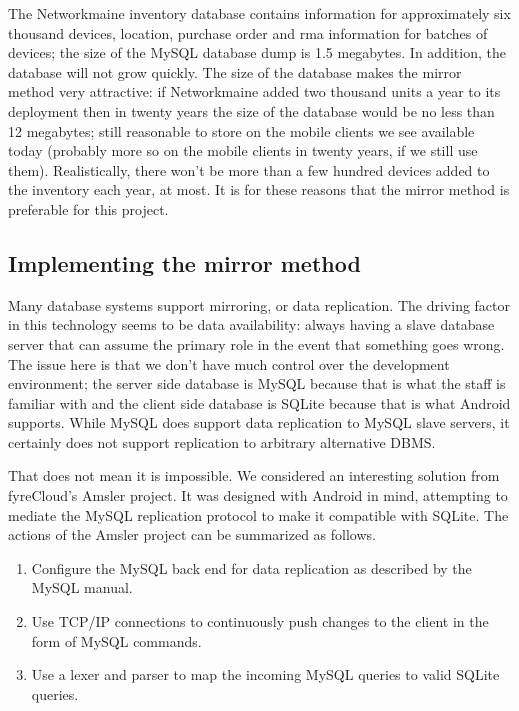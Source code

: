 \documentclass[journal]{IEEEtran}
\begin{document}
The Networkmaine inventory database contains information for approximately six thousand devices, location, purchase order and rma information for batches of devices; the size of the MySQL database dump is 1.5 megabytes. In addition, the database will not grow quickly. The size of the database makes the mirror method very attractive: if Networkmaine added two thousand units a year to its deployment then in twenty years the size of the database would be no less than 12 megabytes; still reasonable to store on the mobile clients we see available today (probably more so on the mobile clients in twenty years, if we still use them). Realistically, there won't be more than a few hundred devices added to the inventory each year, at most. It is for these reasons that the mirror method is preferable for this project. 


\subsection{Implementing the mirror method}

Many database systems support mirroring, or data replication. The driving factor in this technology seems to be data availability: always having a slave database server that can assume the primary role in the event that something goes wrong\cite{microsoft_database_????}. The issue here is that we don't have much control over the development environment; the server side database is MySQL because that is what the staff is familiar with and the client side database is SQLite because that is what Android supports. While MySQL does support data replication to MySQL slave servers, it certainly does not support replication to arbitrary alternative DBMS\cite{mySQL_mySQL_????}.

That does not mean it is impossible. We considered an interesting solution from fyreCloud's Amsler project. It was designed with Android in mind, attempting to mediate the MySQL replication protocol to make it compatible with SQLite\cite{fyrecloud_solutions_fyrecloud_????}. The actions of the Amsler project can be summarized as follows.

\begin{enumerate}
\item Configure the MySQL back end for data replication as described by the MySQL manual. 
\item Use TCP/IP connections to continuously push changes to the client in the form of MySQL commands.
\item Use a lexer and parser to map the incoming MySQL queries to valid SQLite queries. 
\end{enumerate}
\end{document}
